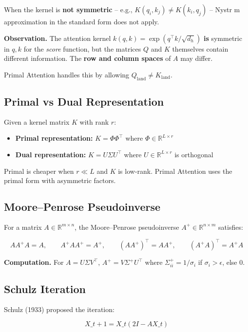 When the kernel is \textbf{not symmetric} -- e.g., $K(q_i, k_j) \ne K(k_i, q_j)$ 
-- Nystr m approximation in the standard form does not apply.

\textbf{Observation.} The attention kernel $k(q, k) = \exp(q^\top k / \sqrt{d_h})$ 
\textbf{is} symmetric in $q, k$ for the \textit{score} function, but the matrices $Q$ and 
$K$ themselves contain different information. The \textbf{row and column spaces} 
of $A$ may differ.

Primal Attention handles this by allowing $Q_\text{land} \ne K_\text{land}$.

\subsection{Primal vs Dual Representation}

Given a kernel matrix $K$ with rank $r$:

\begin{itemize}
\item \textbf{Primal representation:} $K = \Phi \Phi^\top$ where $\Phi \in \mathbb{R}^{L \times r}$
\item \textbf{Dual representation:} $K = U \Sigma U^\top$ where $U \in \mathbb{R}^{L \times r}$ is orthogonal

\end{itemize}
Primal is cheaper when $r \ll L$ and $K$ is low-rank. Primal Attention uses 
the primal form with asymmetric factors.

\subsection{Moore--Penrose Pseudoinverse}

For a matrix $A \in \mathbb{R}^{m \times n}$, the Moore--Penrose pseudoinverse 
$A^+ \in \mathbb{R}^{n \times m}$ satisfies:

\[
A A^+ A = A, \qquad A^+ A A^+ = A^+, \qquad (A A^+)^\top = A A^+, \qquad (A^+ A)^\top = A^+ A
\]

\textbf{Computation.} For $A = U \Sigma V^\top$, $A^+ = V \Sigma^+ U^\top$ where 
$\Sigma^+_{ii} = 1/\sigma_i$ if $\sigma_i > \epsilon$, else $0$.

\subsection{Schulz Iteration}

Schulz (1933) proposed the iteration:

\[
X\_{t+1} = X\_t (2I - A X\_t)
\]

